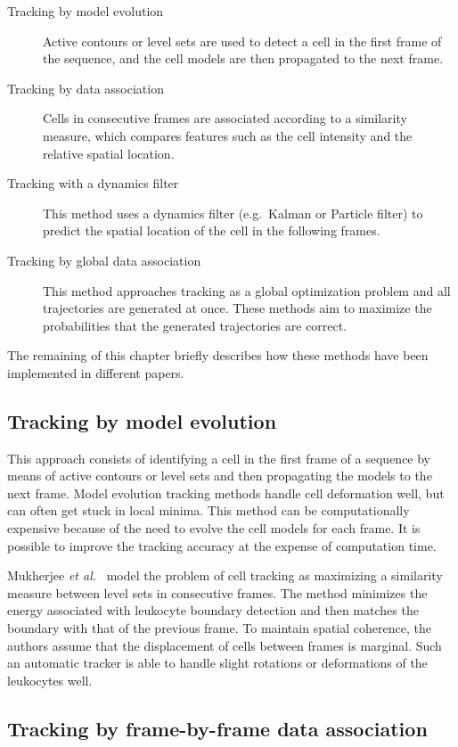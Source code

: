 \begin{description}
	\item [Tracking by model evolution] Active contours or level sets are used to detect a cell in the first frame of the sequence, and the cell models are then propagated to the next frame.
	\item [Tracking by data association] Cells in consecutive frames are associated according to a similarity measure, which compares features such as the cell intensity and the relative spatial location.
	\item [Tracking with a dynamics filter] This method uses a dynamics filter (e.g.\ Kalman or Particle filter) to predict the spatial location of the cell in the following frames.
	\item [Tracking by global data association] This method approaches tracking as a global optimization problem and all trajectories are generated at once. These methods aim to maximize the probabilities that the generated trajectories are correct.
\end{description}

The remaining of this chapter briefly describes how these methods have been implemented in different papers.

\subsection{Tracking by model evolution}

This approach consists of identifying a cell in the first frame of a sequence by means of active contours or level sets and then propagating the models to the next frame. Model evolution tracking methods handle cell deformation well, but can often get stuck in local minima. This method can be computationally expensive because of the need to evolve the cell models for each frame. It is possible to improve the tracking accuracy at the expense of computation time.

Mukherjee \emph{et al.}~\cite{mukherjee04} model the problem of cell tracking as maximizing a similarity measure between level sets in consecutive frames. The method minimizes the energy associated with leukocyte boundary detection and then matches the boundary with that of the previous frame. To maintain spatial coherence, the authors assume that the displacement of cells between frames is marginal. Such an automatic tracker is able to handle slight rotations or deformations of the leukocytes well.

\subsection{Tracking by frame-by-frame data association}


